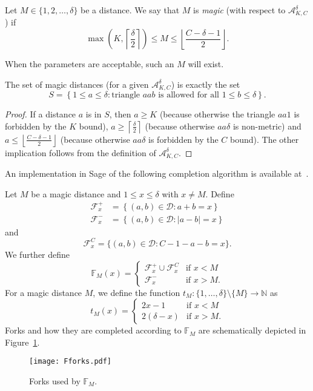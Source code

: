 \documentclass[11pt]{amsart}
\begin{document}
\begin{definition}
Let $M\in\{1,2,\dots, \delta\}$ be a distance. We say that $M$ is {\em magic} (with respect to $\mathcal A^\delta_{K,C}$) if $$\max\left(K, \left\lceil\frac{\delta}{2}\right\rceil\right) \leq M \leq \left\lfloor\frac{C-\delta-1}{2}\right\rfloor.$$
\end{definition}
When the parameters are acceptable, such an $M$ will exist.

\begin{observation}\label{obs:magicismagic}
The set of magic distances (for a given $\mathcal A^\delta_{K,C}$) is exactly the set $$S=\left\{1\leq a \leq \delta : \text{triangle }aab\text{ is allowed for all }1\leq b\leq \delta\right\}.$$
\end{observation}
\begin{proof}
If a distance $a$ is in $S$, then $a\geq K$ (because otherwise the triangle $aa1$ is forbidden by the $K$ bound), $a\geq \left\lceil\frac{\delta}{2}\right\rceil$ (because otherwise $aa\delta$ is non-metric) and $a\leq \left\lfloor\frac{C-\delta-1}{2}\right\rfloor$ (because otherwise $aa\delta$ is forbidden by the $C$ bound). The other implication follows from the definition of $\mathcal A^\delta_{K,C}$.
\end{proof}

An implementation in Sage of the following completion algorithm is available at~\cite{PawliukSage}.

Let $M$ be a magic distance and $1\leq x\leq \delta$ with $x\neq M$. Define 
\[
\begin{split}
\mathcal F^+_x &= \left\{(a,b)\in \mathcal D : a+b=x\right\}\\ 
\mathcal F^-_x &= \left\{(a,b)\in \mathcal D : |a-b|=x\right\}
\end{split}
\]
and $$\mathcal F^C_x = \{(a,b)\in \mathcal D : C-1-a-b=x\}.$$ We further define
$$\mathbb F_M(x) =
\begin{cases} 
      \mathcal F^+_x\cup \mathcal F^C_x & \text{if }x < M \\
      \mathcal F^-_x & \text{if }x > M.
\end{cases}
$$
For a magic distance $M$, we define the function $t_M\colon \{1,\dots,\delta\}\setminus \{M\} \rightarrow \mathbb N$ as
$$t_M(x) =
\begin{cases} 
      2x-1 & \text{if } x < M \\
      2(\delta-x) & \text{if }x > M.
\end{cases}
$$
Forks and how they are completed according to $\mathbb F_M$ are schematically depicted in Figure~\ref{fig:Fforks}.
\begin{figure}
\centering
\texttt{[image: Fforks.pdf]}
\caption{Forks used by $\mathbb F_M$.}
\label{fig:Fforks}
\end{figure}
\end{document}
